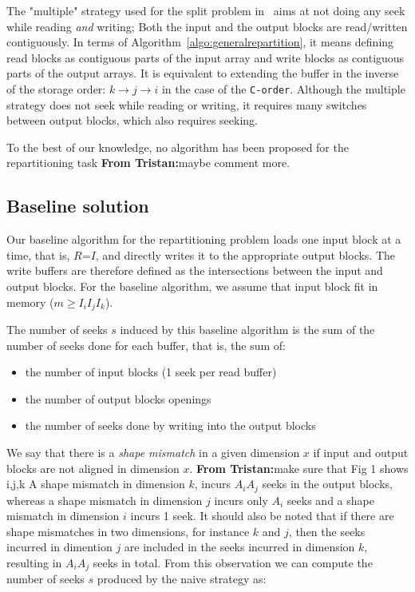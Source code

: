 \documentclass[sigconf, nonacm]{acmart}
\newcommand{\tristan}[1]{\color{orange}\textbf{From Tristan:}#1\color{black}}
\begin{document}
The "multiple" strategy used for the split problem in~\cite{seqalgorithms}
aims at not doing any seek while reading \textit{and} writing;
Both the input and the output blocks are read/written contiguously. In
terms of Algorithm~\ref{algo:generalrepartition}, it means defining read blocks as
contiguous parts of the input array and write blocks as contiguous parts of
the output arrays. It is equivalent to extending the buffer  in the inverse of
the storage order: $k \rightarrow j \rightarrow i$ in the case
of the \texttt{C-order}. Although the multiple strategy does not seek while reading or writing, it 
requires many switches between output blocks, which also requires seeking. 

To the best of our knowledge, no algorithm has been proposed for the
repartitioning task \tristan{maybe comment more}.

\subsection{Baseline solution}

Our baseline algorithm for the repartitioning problem loads one input block
at a time, that is, $R$=$I$,
and directly writes it to the appropriate output blocks.
The write buffers are therefore defined as the intersections between the input
and output blocks.
For the baseline algorithm, we assume that input block fit in memory ($m \geq I_iI_jI_k$).

The number of seeks $s$ induced by this baseline algorithm is the
sum of the number of seeks done for each buffer, that is, the sum of:
\begin{itemize}
  \item the number of input blocks (1 seek per read buffer)
  \item the number of output blocks openings
  \item the number of seeks done by writing into the output blocks
\end{itemize}

We say that there is a \emph{shape mismatch} in a given dimension $x$ if
input and output blocks are not aligned in dimension $x$. \tristan{make sure that Fig 1 shows i,j,k} A shape mismatch
in dimension $k$, incurs $A_iA_j$ seeks in the output blocks, whereas a
shape mismatch in dimension $j$ incurs only $A_i$ seeks and a shape
mismatch in dimension $i$ incurs 1 seek. It should also be noted that if
there are shape mismatches in two dimensions, for instance $k$ and $j$,
then the seeks incurred in dimention $j$ are included in the seeks incurred
in dimension $k$, resulting in $A_iA_j$ seeks in total. From this
observation we can compute the number of seeks $s$ produced by the naive
strategy as:
\end{document}
